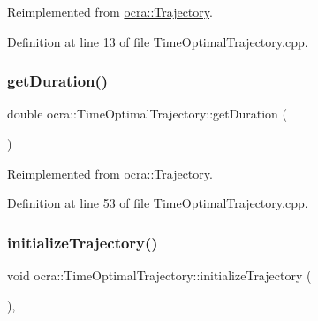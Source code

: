 Reimplemented from \hyperlink{classocra_1_1Trajectory_a2102a829e6dad497f7c773c346d499b7}{ocra\+::\+Trajectory}.



Definition at line 13 of file Time\+Optimal\+Trajectory.\+cpp.

\hypertarget{classocra_1_1TimeOptimalTrajectory_a561d2d6ad9c40c88783265a91193a0ab}{}\label{classocra_1_1TimeOptimalTrajectory_a561d2d6ad9c40c88783265a91193a0ab} 
\subsubsection{\texorpdfstring{get\+Duration()}{getDuration()}}
{\footnotesize\ttfamily double ocra\+::\+Time\+Optimal\+Trajectory\+::get\+Duration (\begin{DoxyParamCaption}{ }\end{DoxyParamCaption})\hspace{0.3cm}{\ttfamily [virtual]}}



Reimplemented from \hyperlink{classocra_1_1Trajectory_ad65e4ce63f33d79d7880742035a64d6c}{ocra\+::\+Trajectory}.



Definition at line 53 of file Time\+Optimal\+Trajectory.\+cpp.

\hypertarget{classocra_1_1TimeOptimalTrajectory_a1ddd759810abea6db2462dca3aae585c}{}\label{classocra_1_1TimeOptimalTrajectory_a1ddd759810abea6db2462dca3aae585c} 
\subsubsection{\texorpdfstring{initialize\+Trajectory()}{initializeTrajectory()}}
{\footnotesize\ttfamily void ocra\+::\+Time\+Optimal\+Trajectory\+::initialize\+Trajectory (\begin{DoxyParamCaption}{ }\end{DoxyParamCaption})\hspace{0.3cm}{\ttfamily [protected]}, {\ttfamily [virtual]}}



